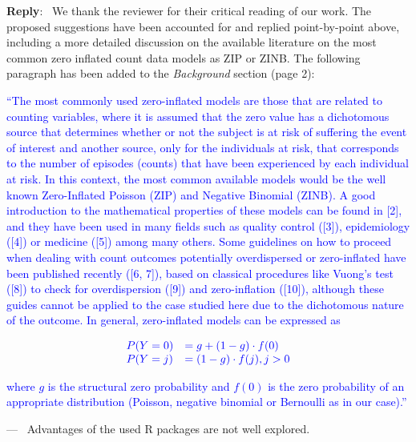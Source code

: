 \documentclass[11pt]{article}
\newcounter{reviewer}
\newcounter{point}[reviewer]
\renewcommand{\thepoint}{C\,\arabic{point}}
\newenvironment{point}
   {\refstepcounter{point} \bigskip \noindent {\textbf{Reviewer~Comment~\thepoint} } ---\ }
   {\par }
\newenvironment{reply}
   {\medskip \noindent \begin{sf}\textbf{Reply}:\  }
   {\medskip \end{sf}}
\begin{document}
\begin{reply}
We thank the reviewer for their critical reading of our work. The proposed suggestions have been accounted for and replied point-by-point above, including a more detailed discussion on the available literature on the most common zero inflated count data models as ZIP or ZINB. The following paragraph has been added to the \textit{Background} section (page 2):

\textcolor{blue}{``The most commonly used zero-inflated models are those that are related to counting variables, where it is assumed that the zero value has a dichotomous source that determines whether or not the subject is at risk of suffering the event of interest and another source, only for the individuals at risk, that corresponds to the number of episodes (counts) that have been experienced by each individual at risk. In this context, the most common available models would be the well known Zero-Inflated Poisson (ZIP) and Negative Binomial (ZINB). A good introduction to the mathematical properties of these models can be found in [2], and they have been used in many fields such as quality control ([3]), epidemiology ([4]) or medicine ([5]) among many others. Some guidelines on how to proceed when dealing with count outcomes potentially overdispersed or zero-inflated have been published recently ([6, 7]), based on classical procedures like Vuong's test ([8]) to check for overdispersion ([9]) and zero-inflation ([10]), although these guides cannot be applied to the case studied here due to the dichotomous nature of the outcome. In general, zero-inflated models can be expressed as}

\begin{equation}\begin{array}{ll}
 \color{blue}P(Y=0) & \color{blue}= g + (1-g) \cdot f(0) \\
 \color{blue}P(Y=j) & \color{blue}= (1-g) \cdot f(j), j > 0\\
\end{array}\end{equation}

\noindent \textcolor{blue}{where $g$ is the structural zero probability and $f(0)$ is the zero probability of an appropriate distribution (Poisson, negative binomial or Bernoulli as in our case).''}

\end{reply}

\begin{point}
Advantages of the used R packages are not well explored.
	\label{pt:C9}
\end{point}
\end{document}
